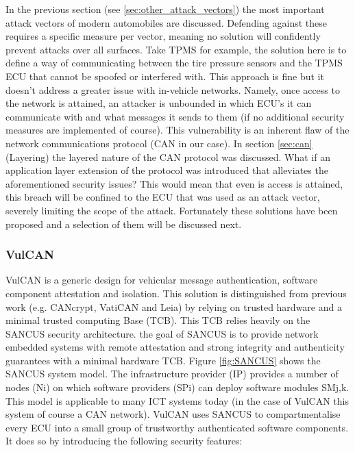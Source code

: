 \documentclass[11pt]{article}
\begin{document}
In the previous section (see \ref{sec:other_attack_vectors}) the most important attack vectors of modern automobiles are discussed. Defending against these requires a specific measure per vector, meaning no solution will confidently prevent attacks over all surfaces. Take TPMS for example, the solution here is to define a way of communicating between the tire pressure sensors and the TPMS ECU that cannot be spoofed or interfered with. This approach is fine but it doesn't address a greater issue with in-vehicle networks. Namely, once access to the network is attained, an attacker is unbounded in which ECU's it can communicate with and what messages it sends to them (if no additional security measures are implemented of course). This vulnerability is an inherent flaw of the network communications protocol (CAN in our case). In section \ref{sec:can} (Layering) the layered nature of the CAN protocol was discussed. What if an application layer extension of the protocol was introduced that alleviates the aforementioned security issues? This would mean that even is access is attained, this breach will be confined to the ECU that was used as an attack vector, severely limiting the scope of the attack. Fortunately these solutions have been proposed and a selection of them will be discussed next.

\subsubsection{VulCAN} 
VulCAN is a generic design for vehicular message authentication, software component attestation and isolation. This solution is distinguished from previous work (e.g. CANcrypt\cite{Pfeiffer}, VatiCAN\cite{VatiCAN} and Leia\cite{Leia}) by relying on trusted hardware and a minimal trusted computing Base (TCB). This TCB relies heavily on the SANCUS\cite{Sancus} security architecture. the goal of SANCUS is to provide network embedded systems with remote attestation and strong integrity and authenticity guarantees with a minimal hardware TCB. Figure \ref{fig:SANCUS} shows the SANCUS system model. The infrastructure provider (IP) provides a number of nodes (Ni) on which software providers (SPi) can deploy software modules SMj,k. This model is applicable to many ICT systems today (in the case of VulCAN this system of course a CAN network).\cite{Sancus} VulCAN uses SANCUS to compartmentalise every ECU into a small group of trustworthy authenticated software components. It does so by introducing the following security features: 
\end{document}
